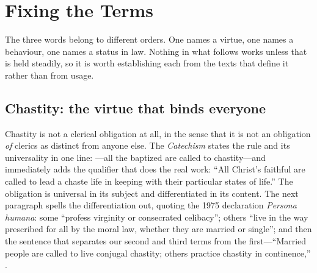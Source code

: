 \section{Fixing the Terms}

The three words belong to different orders. One names a virtue, one names a behaviour, one names a status in law. Nothing in what follows works unless that is held steadily, so it is worth establishing each from the texts that define it rather than from usage.

\subsection{Chastity: the virtue that binds everyone}

Chastity is not a clerical obligation at all, in the sense that it is not an obligation \emph{of} clerics as distinct from anyone else. The \emph{Catechism} states the rule and its universality in one line: ---all the baptized are called to chastity---and immediately adds the qualifier that does the real work: ``All Christ's faithful are called to lead a chaste life in keeping with their particular states of life.'' The obligation is universal in its subject and differentiated in its content. The next paragraph spells the differentiation out, quoting the 1975 declaration \emph{Persona humana}: some ``profess virginity or consecrated celibacy''; others ``live in the way prescribed for all by the moral law, whether they are married or single''; and then the sentence that separates our second and third terms from the first---``Married people are called to live conjugal chastity; others practice chastity in continence,'' .

